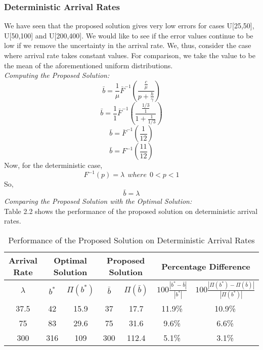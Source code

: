
\subsubsection{Deterministic Arrival Rates}
We have seen that the proposed solution gives very low errors for cases U[25,50], U[50,100] and U[200,400]. We would like to see if the error values continue to be low if we remove the uncertainty in the arrival rate. We, thus, consider the case where arrival rate takes constant values. For comparison, we take the value to be the mean of the aforementioned uniform distributions. \\
\textit{Computing the Proposed Solution:}\\
\[\bar{b}=\frac{1}{\mu}\bar{F}^{-1}(\frac{\frac{c}{\mu}}{p + \frac{h}{\gamma}})\]
\[\bar{b}=\frac{1}{1}\bar{F}^{-1}(\frac{\frac{1/3}{1}}{1 + \frac{1}{1/3}})\]
\[\bar{b}=\bar{F}^{-1}(\frac{1}{12})\]
\[\bar{b}=F^{-1}(\frac{11}{12})\]
Now, for the deterministic case,
\[F^{-1}(p) = \lambda \ \ where \ \ 0<p<1\]
So,
\[\bar{b}= \lambda \]
\textit{Comparing the Proposed Solution with the Optimal Solution:}\\
Table 2.2 shows the performance of the proposed solution on deterministic arrival rates.
\begin{center}
\begin{table}[hbt!]
            \begin{tabular}{|c||c|c|c|c|c|c|}
            \hline
            Arrival Rate &  \multicolumn{2}{|c|}{Optimal Solution} & \multicolumn{2}{|c|}{Proposed Solution}& \multicolumn{2}{|c|}{Percentage Difference} \\
            \hline
                $\lambda$& $b^*$ & $\Pi(b^*)$ & $\bar{b}$& $\Pi(\bar{b})$& $100\frac{|b^*-\bar{b}|}{|b^*|}$& $100\frac{|\Pi(b^*)-\Pi(\bar{b})|}{|\Pi(b^*)|}$\\ 
                    \hline \hline
                    37.5 & 42 & 15.9 & 37 & 17.7 & 11.9\%& 10.9\%\\
                    75 & 83 & 29.6 & 75 & 31.6 & 9.6\%& 6.6\%\\
                    300 & 316 & 109 & 300 & 112.4 & 5.1\%& 3.1\%\\
            \hline
            \end{tabular} 
            \caption{Performance of the Proposed Solution on Deterministic Arrival Rates}            
\end{table}
\end{center}